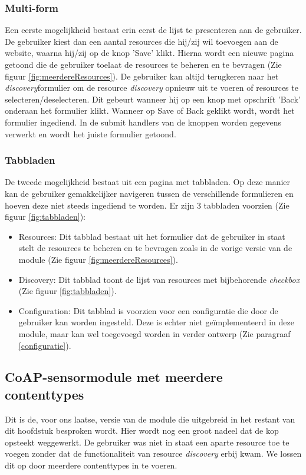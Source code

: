\subsubsection{Multi-form}
Een eerste mogelijkheid bestaat erin eerst de lijst te presenteren aan de gebruiker. De gebruiker kiest dan een aantal resources die hij/zij wil toevoegen aan de website, waarna hij/zij op de knop 'Save' klikt. Hierna wordt een nieuwe pagina getoond die de gebruiker toelaat de resources te beheren en te bevragen (Zie figuur \ref{fig:meerdereResources}). De gebruiker kan altijd terugkeren naar het \textit{discovery}formulier om de resource \textit{discovery} opnieuw uit te voeren of resources te selecteren/deselecteren. Dit gebeurt wanneer hij op een knop met opschrift 'Back' onderaan het formulier klikt. Wanneer op Save of Back geklikt wordt, wordt het formulier ingediend. In de submit handlers van de knoppen worden gegevens verwerkt en wordt het juiste formulier getoond.

\subsubsection{Tabbladen}
De tweede mogelijkheid bestaat uit een pagina met tabbladen. Op deze manier kan de gebruiker gemakkelijker navigeren tussen de verschillende formulieren en hoeven deze niet steeds ingediend te worden. Er zijn 3 tabbladen voorzien (Zie figuur \ref{fig:tabbladen}):
\begin{itemize}
\item Resources: Dit tabblad bestaat uit het formulier dat de gebruiker in staat stelt de resources te beheren en te bevragen zoals in de vorige versie van de module (Zie figuur \ref{fig:meerdereResources}).
\item Discovery: Dit tabblad toont de lijst van resources met bijbehorende \textit{checkbox} (Zie figuur \ref{fig:tabbladen}).
\item Configuration: Dit tabblad is voorzien voor een configuratie die door de gebruiker kan worden ingesteld. Deze is echter niet ge\"{i}mplementeerd in deze module, maar kan wel toegevoegd worden in verder ontwerp (Zie paragraaf \ref{configuratie}).
\end{itemize}

\subsection{CoAP-sensormodule met meerdere contenttypes}
Dit is de, voor ons laatse, versie van de module die uitgebreid in het restant van dit hoofdstuk besproken wordt. Hier wordt nog een groot nadeel dat de kop opsteekt weggewerkt. De gebruiker was niet in staat een aparte resource toe te voegen zonder dat de functionaliteit van resource \textit{discovery} erbij kwam. We lossen dit op door meerdere contenttypes in te voeren.

